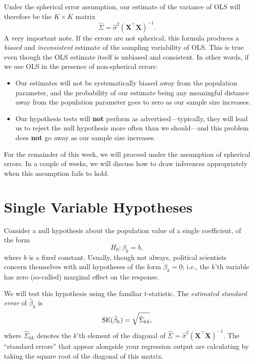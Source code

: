 \documentclass[12pt,oneside,openany]{book}
\begin{document}
Under the spherical error assumption, our estimate of the variance of
OLS will therefore be the \(K \times K\) matrix \[
\hat{\Sigma} = \hat{\sigma}^2 (\mathbf{X}^\top \mathbf{X})^{-1}.
\] A very important note. If the errors are not spherical, this formula
produces a \emph{biased} and \emph{inconsistent} estimate of the
sampling variability of OLS. This is true even though the OLS estimate
itself is unbiased and consistent. In other words, if we use OLS in the
presence of non-spherical errors:

\begin{itemize}
\item
  Our estimates will not be systematically biased away from the
  population parameter, and the probability of our estimate being any
  meaningful distance away from the population parameter goes to zero as
  our sample size increases.
\item
  Our hypothesis tests will \textbf{not} perform as
  advertised---typically, they will lead us to reject the null
  hypothesis more often than we should---and this problem does
  \textbf{not} go away as our sample size increases.
\end{itemize}

For the remainder of this week, we will proceed under the assumption of
spherical errors. In a couple of weeks, we will discuss how to draw
inferences appropriately when this assumption fails to hold.

\section{Single Variable Hypotheses}\label{single-variable-hypotheses}

Consider a null hypothesis about the population value of a single
coefficient, of the form \[
H_0 : \beta_k = b,
\] where \(b\) is a fixed constant. Usually, though not always,
political scientists concern themselves with null hypotheses of the form
\(\beta_k = 0\); i.e., the \(k\)'th variable has zero (so-called)
marginal effect on the response.

We will test this hypothesis using the familiar \(t\)-statistic. The
\emph{estimated standard error} of \(\hat{\beta}_k\) is \[
\mathop{\rm SE}\nolimits(\hat{\beta}_k) = \sqrt{\hat{\Sigma}_{kk}},
\] where \(\hat{\Sigma}_{kk}\) denotes the \(k\)'th element of the
diagonal of
\(\hat{\Sigma} = \hat{\sigma}^2 (\mathbf{X}^\top \mathbf{X})^{-1}\). The
``standard errors'' that appear alongside your regression output are
calculating by taking the square root of the diagonal of this matrix.
\end{document}
